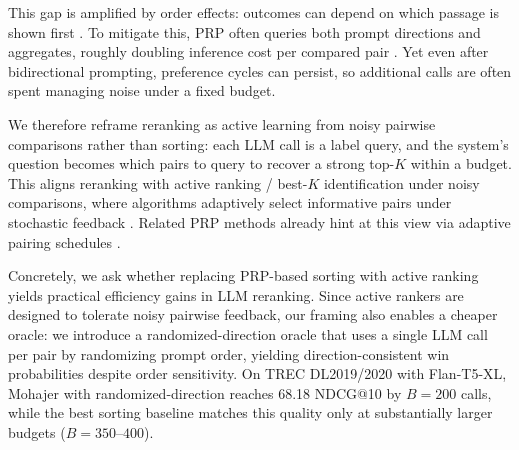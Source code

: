 \documentclass[11pt]{article}
\begin{document}
This gap is amplified by order effects: outcomes can depend on which passage is shown first
\citep{shi2024judges,yin2025fragile,jeong2025comparativetrap}.
To mitigate this, PRP often queries both prompt directions and aggregates, roughly doubling inference cost per compared pair
\citep{qin2024pairwise,wu2025realtimeprp}.
Yet even after bidirectional prompting, preference cycles can persist, so additional calls are often spent managing noise under a fixed budget.

We therefore reframe reranking as active learning from noisy pairwise comparisons rather than sorting:
each LLM call is a label query, and the system's question becomes which pairs to query to recover a strong top-$K$ within a budget.
This aligns reranking with active ranking / best-$K$ identification under noisy comparisons, where algorithms adaptively select informative pairs under stochastic feedback
\citep{mohajer2017active,heckel2016activeranking,shah2018simplerobust,ren2020bestk}.
Related PRP methods already hint at this view via adaptive pairing schedules \citep{luo-etal-2024-prp}.

Concretely, we ask whether replacing PRP-based sorting with active ranking yields practical efficiency gains in LLM reranking.
Since active rankers are designed to tolerate noisy pairwise feedback, our framing also enables a cheaper oracle:
we introduce a randomized-direction oracle that uses a single LLM call per pair by randomizing prompt order, yielding direction-consistent win probabilities despite order sensitivity.
On TREC DL2019/2020 with Flan-T5-XL, Mohajer with randomized-direction reaches 68.18 NDCG@10 by $B{=}200$ calls,
while the best sorting baseline matches this quality only at substantially larger budgets ($B{=}350$--$400$).



\end{document}
